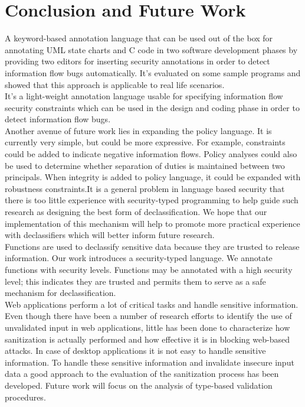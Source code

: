 \chapter{Conclusion and Future Work}

A keyword-based annotation language that can be used out of the box for annotating UML state charts and C code in two software development phases by providing two editors for inserting security annotations in order to detect information flow bugs automatically. It's evaluated on some sample programs and showed that this approach is applicable to real life scenarios.\\ 

It's a light-weight annotation language usable for specifying
information flow security constraints which can be used in the
design and coding phase in order to detect information flow
bugs.\\

Another avenue of future work lies in expanding the policy
language. It is currently very simple, but could be more expressive.
For example, constraints could be added to indicate negative information flows. Policy analyses could also be used to determine
whether separation of duties is maintained between two principals.
When integrity is added to policy language, it could be expanded with robustness constraints.It is a general problem in language based security that there is too little experience with security-typed
programming to help guide such research as designing the best
form of declassification. We hope that our implementation of this
mechanism will help to promote more practical experience
with declassifiers which will better inform future research.\\

Functions are used to declassify sensitive data because they are trusted to release information. Our work introduces a security-typed language. We annotate functions with security levels. Functions may be annotated with a high security level; this indicates they are trusted and permits them to serve as a safe mechanism for declassification. \\

Web applications perform a lot of critical tasks and
handle sensitive information. Even though there have been
a number of research efforts to identify the use of unvalidated input in web applications, little has been done
to characterize how sanitization is actually performed and
how effective it is in blocking web-based attacks. In case of desktop applications it is not easy to handle sensitive information. To handle these sensitive information and invalidate insecure input data a good approach to the evaluation of the sanitization process has been developed. Future work will focus on the analysis of type-based validation procedures.  \\


